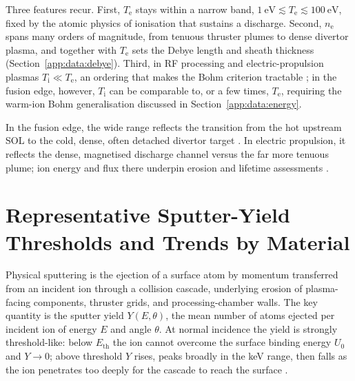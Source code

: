 Three features recur. First, $T_{\mathrm{e}}$ stays within a narrow band, $\SI{1}{\eV} \lesssim T_{\mathrm{e}} \lesssim \SI{100}{\eV}$, fixed by the atomic physics of ionisation that sustains a discharge. Second, $n_{\mathrm{e}}$ spans many orders of magnitude, from tenuous thruster plumes to dense divertor plasma, and together with $T_{\mathrm{e}}$ sets the Debye length and sheath thickness (Section~\ref{app:data:debye}). Third, in RF processing and electric-propulsion plasmas $T_{\mathrm{i}} \ll T_{\mathrm{e}}$, an ordering that makes the Bohm criterion tractable \cite{ref0001,ref0013}; in the fusion edge, however, $T_{\mathrm{i}}$ can be comparable to, or a few times, $T_{\mathrm{e}}$, requiring the warm-ion Bohm generalisation discussed in Section~\ref{app:data:energy}.

In the fusion edge, the wide range reflects the transition from the hot upstream SOL to the cold, dense, often detached divertor target \cite{ref0013,ref0017}. In electric propulsion, it reflects the dense, magnetised discharge channel versus the far more tenuous plume; ion energy and flux there underpin erosion and lifetime assessments \cite{ref0074,ref0105}.

\section{Representative Sputter-Yield Thresholds and Trends by Material}
\label{app:data:sputter}

Physical sputtering is the ejection of a surface atom by momentum transferred from an incident ion through a collision cascade, underlying erosion of plasma-facing components, thruster grids, and processing-chamber walls. The key quantity is the sputter yield $Y(E,\theta)$, the mean number of atoms ejected per incident ion of energy $E$ and angle $\theta$. At normal incidence the yield is strongly threshold-like: below $E_{\mathrm{th}}$ the ion cannot overcome the surface binding energy $U_0$ and $Y \to 0$; above threshold $Y$ rises, peaks broadly in the \si{\kilo\eV} range, then falls as the ion penetrates too deeply for the cascade to reach the surface \cite{ref0143,ref0144}.

